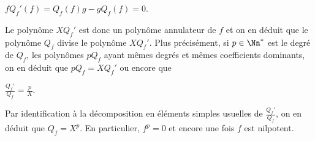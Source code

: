 {{\begin{center}
$fQ_f'(f)=Q_f(f)g-gQ_f(f)=0$.
\end{center}

Le polynôme $XQ_f'$ est donc un polynôme annulateur de $f$ et on en déduit que le polynôme $Q_f$ divise le polynôme $XQ_f'$. Plus précisément, si $p\in\Nn^*$ est le degré de $Q_f$, les polynômes $pQ_f$ ayant mêmes degrés et mêmes coefficients dominants, on en déduit que $pQ_f=XQ_f'$ ou encore que

\begin{center}
$\frac{Q_f'}{Q_f}=\frac{p}{X}$.
\end{center}

Par identification à la décomposition en éléments simples usuelles de $\frac{Q_f'}{Q_f}$, on en déduit que $Q_f=X^p$. En particulier, $f^p=0$ et encore une fois $f$ est nilpotent.
}
}
